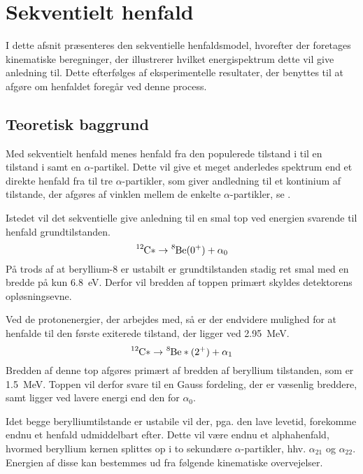 \chapter{Sekventielt henfald}
\label{cha:sekventielt-henfald}
I dette afsnit præsenteres den sekventielle henfaldsmodel, hvorefter der foretages kinematiske
beregninger, der illustrerer hvilket energispektrum dette vil give anledning til. Dette efterfølges
af eksperimentelle resultater, der benyttes til at afgøre om henfaldet foregår ved denne process.  

\section{Teoretisk baggrund}
\label{sec:sekventiel-teo}

Med sekventielt henfald menes henfald fra den populerede tilstand i \Carb til en tilstand i \Be samt
en $\alpha$-partikel. Dette vil give et meget anderledes spektrum end et direkte henfald fra \Carb til
tre $\alpha$-partikler, som giver andledning til et kontinium af tilstande, der afgøres af vinklen mellem
de enkelte $\alpha$-partikler, se \cite{Becker}.

Istedet vil det sekventielle give anledning til en smal top ved energien svarende til henfald
grundtilstanden.
\begin{equation}
  \label{eq:alpha0}
  \Carb* \rightarrow \Be(0^{+}) + \alpha_{0}
\end{equation}
På trods af at beryllium-8 er ustabilt er grundtilstanden stadig ret smal med en bredde på kun
\SI{6.8}{\eV}. Derfor vil bredden af toppen primært skyldes detektorens opløsningsevne. 

Ved de protonenergier, der arbejdes med, så er der endvidere mulighed for at henfalde til den første
exiterede tilstand, der ligger ved \SI{2.95}{\MeV}.
\begin{equation}
  \label{eq:alpha0}
  \Carb* \rightarrow \Be*(2^{+}) + \alpha_{1}
\end{equation}
Bredden af denne top afgøres primært af bredden af beryllium tilstanden, som er
\SI{1.5}{\MeV}. Toppen vil derfor svare til en Gauss fordeling, der er væsenlig breddere, samt ligger
ved lavere energi end den for $\alpha_{0}$.

Idet begge berylliumtilstande er ustabile vil der, pga. den lave levetid, forekomme endnu et henfald
udmiddelbart efter. Dette vil være endnu et alphahenfald, hvormed beryllium kernen splittes op i to
sekundære $\alpha$-partikler, hhv. $\alpha_{21}$ og $\alpha_{22}$. Energien af disse kan bestemmes ud fra følgende
kinematiske overvejelser.

